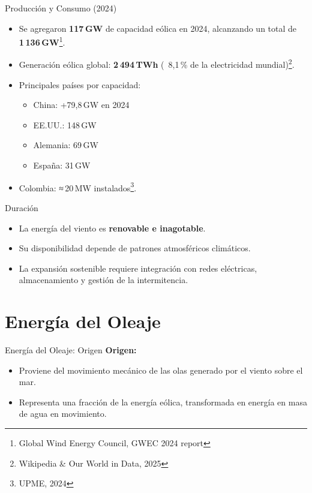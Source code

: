 \documentclass[main.tex]{subfiles}
\begin{document}
\begin{frame}{Producción y Consumo (2024)}
    \begin{itemize}
        \item Se agregaron \textbf{117 GW} de capacidad eólica en 2024, alcanzando un total de \textbf{1 136 GW}\footnote{Global Wind Energy Council, GWEC 2024 report}.
        \item Generación eólica global: \textbf{2 494 TWh} (~8,1 \% de la electricidad mundial)\footnote{Wikipedia \& Our World in Data, 2025}.
        \item Principales países por capacidad:  
        \begin{itemize}
            \item China: +79,8 GW en 2024  
            \item EE.UU.: 148 GW
            \item Alemania: 69 GW
            \item España: 31 GW
        \end{itemize}
        \item Colombia: ≈ 20 MW instalados\footnote{UPME, 2024}.
    \end{itemize}
\end{frame}



\begin{frame}{Duración}
    \begin{itemize}
        \item La energía del viento es \textbf{renovable e inagotable}.
        \item Su disponibilidad depende de patrones atmosféricos climáticos.
        \item La expansión sostenible requiere integración con redes eléctricas, almacenamiento y gestión de la intermitencia.
    \end{itemize}
\end{frame}








\section{Energía del Oleaje}
\begin{frame}{Energía del Oleaje: Origen}
    \textbf{Origen:}
    \begin{itemize}
        \item Proviene del movimiento mecánico de las olas generado por el viento sobre el mar.
        \item Representa una fracción de la energía eólica, transformada en energía en masa de agua en movimiento.
    \end{itemize}
\end{frame}
\end{document}
